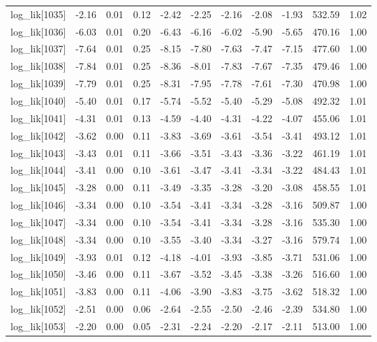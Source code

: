 \begin{table}[ht]
\begin{tabular}{rrrrrrrrrrr}
  log\_lik[1035] & -2.16 & 0.01 & 0.12 & -2.42 & -2.25 & -2.16 & -2.08 & -1.93 & 532.59 & 1.02 \\ 
  log\_lik[1036] & -6.03 & 0.01 & 0.20 & -6.43 & -6.16 & -6.02 & -5.90 & -5.65 & 470.16 & 1.00 \\ 
  log\_lik[1037] & -7.64 & 0.01 & 0.25 & -8.15 & -7.80 & -7.63 & -7.47 & -7.15 & 477.60 & 1.00 \\ 
  log\_lik[1038] & -7.84 & 0.01 & 0.25 & -8.36 & -8.01 & -7.83 & -7.67 & -7.35 & 479.46 & 1.00 \\ 
  log\_lik[1039] & -7.79 & 0.01 & 0.25 & -8.31 & -7.95 & -7.78 & -7.61 & -7.30 & 470.98 & 1.00 \\ 
  log\_lik[1040] & -5.40 & 0.01 & 0.17 & -5.74 & -5.52 & -5.40 & -5.29 & -5.08 & 492.32 & 1.01 \\ 
  log\_lik[1041] & -4.31 & 0.01 & 0.13 & -4.59 & -4.40 & -4.31 & -4.22 & -4.07 & 455.06 & 1.01 \\ 
  log\_lik[1042] & -3.62 & 0.00 & 0.11 & -3.83 & -3.69 & -3.61 & -3.54 & -3.41 & 493.12 & 1.01 \\ 
  log\_lik[1043] & -3.43 & 0.01 & 0.11 & -3.66 & -3.51 & -3.43 & -3.36 & -3.22 & 461.19 & 1.01 \\ 
  log\_lik[1044] & -3.41 & 0.00 & 0.10 & -3.61 & -3.47 & -3.41 & -3.34 & -3.22 & 484.43 & 1.01 \\ 
  log\_lik[1045] & -3.28 & 0.00 & 0.11 & -3.49 & -3.35 & -3.28 & -3.20 & -3.08 & 458.55 & 1.01 \\ 
  log\_lik[1046] & -3.34 & 0.00 & 0.10 & -3.54 & -3.41 & -3.34 & -3.28 & -3.16 & 509.87 & 1.00 \\ 
  log\_lik[1047] & -3.34 & 0.00 & 0.10 & -3.54 & -3.41 & -3.34 & -3.28 & -3.16 & 535.30 & 1.00 \\ 
  log\_lik[1048] & -3.34 & 0.00 & 0.10 & -3.55 & -3.40 & -3.34 & -3.27 & -3.16 & 579.74 & 1.00 \\ 
  log\_lik[1049] & -3.93 & 0.01 & 0.12 & -4.18 & -4.01 & -3.93 & -3.85 & -3.71 & 531.06 & 1.00 \\ 
  log\_lik[1050] & -3.46 & 0.00 & 0.11 & -3.67 & -3.52 & -3.45 & -3.38 & -3.26 & 516.60 & 1.00 \\ 
  log\_lik[1051] & -3.83 & 0.00 & 0.11 & -4.06 & -3.90 & -3.83 & -3.75 & -3.62 & 518.32 & 1.00 \\ 
  log\_lik[1052] & -2.51 & 0.00 & 0.06 & -2.64 & -2.55 & -2.50 & -2.46 & -2.39 & 534.80 & 1.00 \\ 
  log\_lik[1053] & -2.20 & 0.00 & 0.05 & -2.31 & -2.24 & -2.20 & -2.17 & -2.11 & 513.00 & 1.00 \\ 

\end{tabular}
\end{table}
